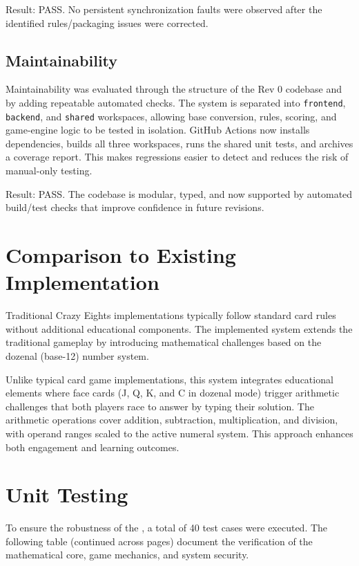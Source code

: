 \documentclass[12pt, titlepage]{article}
\begin{document}
    Result: PASS. No persistent synchronization faults were observed after the
    identified rules/packaging issues were corrected.

    \subsection{Maintainability}

    Maintainability was evaluated through the structure of the Rev 0 codebase and
    by adding repeatable automated checks. The system is separated into
    \texttt{frontend}, \texttt{backend}, and \texttt{shared} workspaces, allowing
    base conversion, rules, scoring, and game-engine logic to be tested in
    isolation. GitHub Actions now installs dependencies, builds all three
    workspaces, runs the shared unit tests, and archives a coverage report. This
    makes regressions easier to detect and reduces the risk of manual-only testing.

    Result: PASS. The codebase is modular, typed, and now supported by automated
    build/test checks that improve confidence in future revisions.

    \section{Comparison to Existing Implementation}

    Traditional Crazy Eights implementations typically follow standard card rules
    without additional educational components. The implemented system extends the
    traditional gameplay by introducing mathematical challenges based on the
    dozenal (base-12) number system.

    Unlike typical card game implementations, this system integrates educational
    elements where face cards (J, Q, K, and C in dozenal mode) trigger arithmetic
    challenges that both players race to answer by typing their solution. The
    arithmetic operations cover addition, subtraction, multiplication, and
    division, with operand ranges scaled to the active numeral system. This
    approach enhances both engagement and learning outcomes.

    \section{Unit Testing}

    To ensure the robustness of the \progname, a total of 40 test cases were executed. The following table (continued across pages) document the verification of the mathematical core, game mechanics, and system security.
\end{document}
